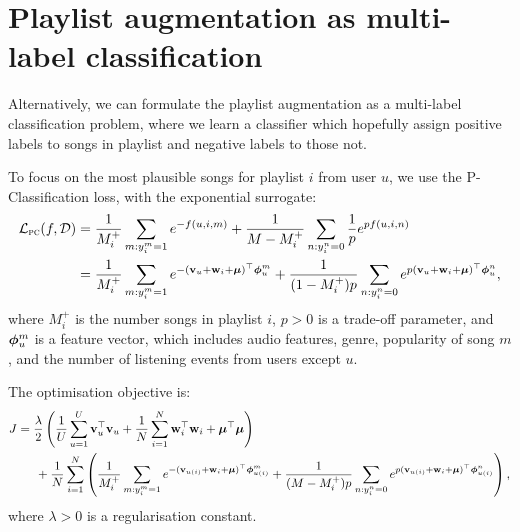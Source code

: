 \section{Playlist augmentation as multi-label classification}

Alternatively, we can formulate the playlist augmentation as a multi-label classification problem,
where we learn a classifier which hopefully assign positive labels to songs in playlist and negative labels to those not.

To focus on the most plausible songs for playlist $i$ from user $u$,
we use the P-Classification loss, with the exponential surrogate:
\begin{equation*}
\begin{aligned}
\mathcal{L}_\textsc{pc}(f, \mathcal{D}) 
&= \frac{1}{M_i^+} \sum_{m: y_i^m = 1} e^{-f(u, i, m)} + \frac{1}{M - M_i^+} \sum_{n: y_i^n = 0} \frac{1}{p} e^{p f(u, i, n)} \\
&= \frac{1}{M_i^+} \sum_{m: y_i^m = 1} e^{-(\mathbf{v}_u + \mathbf{w}_i + \bm{\mu})^\top \bm{\phi}_u^m} 
   + \frac{1}{(1 - M_i^+) p} \sum_{n: y_i^n = 0} e^{p (\mathbf{v}_u + \mathbf{w}_i + \bm{\mu})^\top \bm{\phi}_u^n},
\end{aligned}
\end{equation*}
where $M_i^+$ is the number songs in playlist $i$,
$p > 0$ is a trade-off parameter,
and $\bm{\phi}_u^m$ is a feature vector,
which includes audio features, genre, popularity of song $m$,
and the number of listening events from users except $u$.

The optimisation objective is:
\begin{equation*}
\begin{aligned}
J &= \frac{\lambda}{2} \left( \frac{1}{U} \sum_{u=1}^U \mathbf{v}_u^\top \mathbf{v}_u 
     + \frac{1}{N} \sum_{i=1}^N \mathbf{w}_i^\top \mathbf{w}_i + \bm{\mu}^\top \bm{\mu} \right) \\
& \hspace{1.5em}
     + \frac{1}{N} \sum_{i=1}^N \left( \frac{1}{M_i^+} \sum_{m: y_i^m = 1} e^{-(\mathbf{v}_{u(i)} + \mathbf{w}_i + \bm{\mu})^\top \bm{\phi}_{u(i)}^m} 
     + \frac{1}{(M - M_i^+) p} \sum_{n: y_i^n = 0} e^{p (\mathbf{v}_{u(i)} + \mathbf{w}_i + \bm{\mu})^\top \bm{\phi}_{u(i)}^n} \right),
\end{aligned}
\end{equation*}
where $\lambda > 0$ is a regularisation constant.

